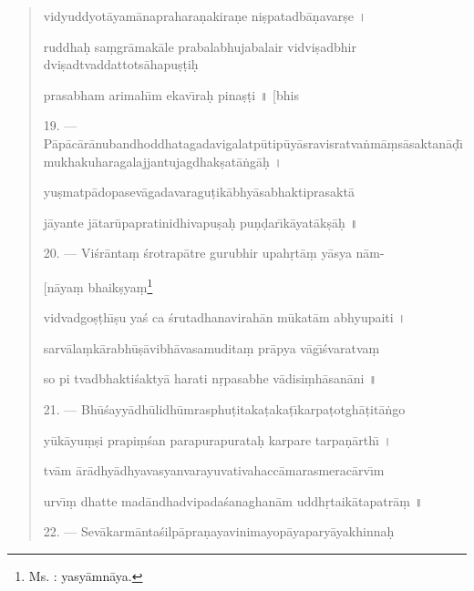 \documentclass[a4paper, 11pt, oneside, french]{article}
\begin{document}
\begin{quotation}
vidyuddyot\={a}yam\={a}naprahara\d{n}akira\d{n}e ni\d{s}patadb\={a}\d{n}avar\d{s}e \texthindi{।}

ruddha\d{h} sa\d{m}gr\={a}mak\={a}le prabalabhujabalair vidvi\d{s}adbhir dvi\d{s}adtvaddattots\={a}hapu\d{s}\d{t}i\d{h}

prasabham arimah\={\i}m ekav\={\i}ra\d{h} pina\d{s}\d{t}i \texthindi{॥} [bhis

\bigskip

19. --- P\={a}p\={a}c\={a}r\={a}nubandhoddhatagadavigalatp\={u}tip\={u}y\={a}sravisratva\.{n}m\={a}\d{m}s\={a}saktan\={a}\d{d}\={\i}mukhakuharagalajjantujagdhak\d{s}at\={a}\.{n}g\={a}\d{h} \texthindi{।}

yu\d{s}matp\={a}dopasev\={a}gadavaragu\d{t}ik\={a}bhy\={a}sabhaktiprasakt\={a}

j\={a}yante j\={a}tar\={u}papratinidhivapu\d{s}a\d{h} pu\d{n}\d{d}ar\={\i}k\={a}yat\={a}k\d{s}\={a}\d{h} \texthindi{॥}

\bigskip

20. --- Vi\'{s}r\={a}nta\d{m} \'{s}rotrap\={a}tre gurubhir upah\d{r}t\={a}\d{m} y\={a}sya n\={a}m-

\hspace*{25mm}[n\={a}ya\d{m} bhaik\d{s}ya\d{m}\footnote{Ms. : yasy\={a}mn\={a}ya.}

vidvadgo\d{s}\d{t}h\={\i}\d{s}u ya\'{s} ca \'{s}rutadhanavirah\={a}n m\={u}kat\={a}m abhyupaiti \texthindi{।}

sarv\={a}la\d{m}k\={a}rabh\={u}\d{s}\={a}vibh\={a}vasamudita\d{m} pr\={a}pya v\={a}g\={\i}\'{s}varatva\d{m}

so pi tvadbhakti\'{s}akty\={a} harati n\d{r}pasabhe v\={a}disi\d{m}h\={a}san\={a}ni \texthindi{॥}

\bigskip

21. --- Bh\={u}\'{s}ayy\={a}dh\={u}lidh\={u}mrasphu\d{t}itaka\d{t}aka\d{t}\={\i}karpa\d{t}otgh\={a}\d{t}it\={a}\.{n}go

y\={u}k\={a}yu\d{m}\d{s}i prapi\d{m}\'{s}an parapurapurata\d{h} karpare tarpa\d{n}\={a}rth\={\i} \texthindi{।}

tv\={a}m \={a}r\={a}dhy\={a}dhyavasyanvarayuvativahacc\={a}marasmerac\={a}rv\={\i}m

urv\={\i}\d{m} dhatte mad\={a}ndhadvipada\'{s}anaghan\={a}m uddh\d{r}taik\={a}tapatr\={a}\d{m} \texthindi{॥}

\bigskip

22. --- Sev\={a}karm\={a}nta\'{s}ilp\={a}pra\d{n}ayavinimayop\={a}yapary\={a}yakhinna\d{h}


\end{quotation}
\end{document}
